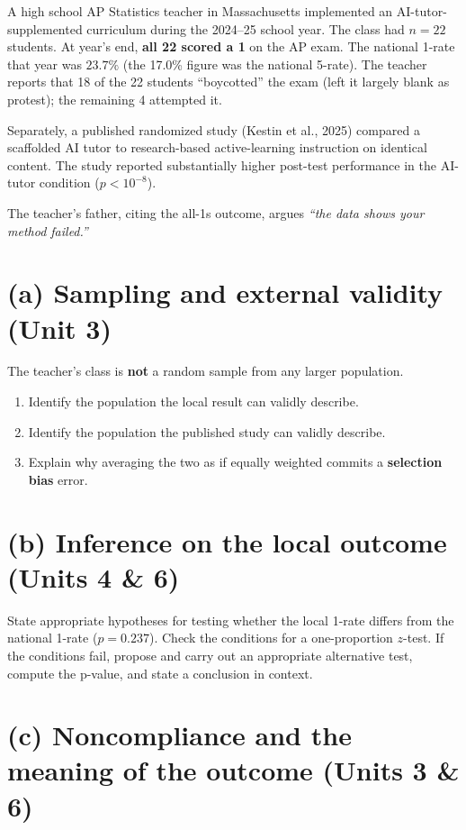 \documentclass[11pt]{article}
\begin{document}
\begin{scenario}
A high school AP Statistics teacher in Massachusetts implemented an
AI-tutor-supplemented curriculum during the 2024--25 school year. The
class had $n = 22$ students. At year's end, \textbf{all 22 scored a 1}
on the AP exam. The national 1-rate that year was $\mathbf{23.7\%}$
(the 17.0\% figure was the national 5-rate). The
teacher reports that 18 of the 22 students ``boycotted'' the exam
(left it largely blank as protest); the remaining 4 attempted it.

Separately, a published randomized study (Kestin et al., 2025) compared
a scaffolded AI tutor to research-based active-learning instruction on
identical content. The study reported substantially higher post-test
performance in the AI-tutor condition ($p < 10^{-8}$).

The teacher's father, citing the all-1s outcome, argues
\emph{``the data shows your method failed.''}
\end{scenario}

\section{(a) Sampling and external validity \textnormal{\small(Unit 3)}}

The teacher's class is \textbf{not} a random sample from any larger
population.
\begin{enumerate}[leftmargin=*,label=(\roman*)]
  \item Identify the population the local result can validly describe.
  \item Identify the population the published study can validly describe.
  \item Explain why averaging the two as if equally weighted commits a
  \textbf{selection bias} error.
\end{enumerate}

\section{(b) Inference on the local outcome \textnormal{\small(Units 4 \& 6)}}

State appropriate hypotheses for testing whether the local 1-rate
differs from the national 1-rate ($p = 0.237$). Check the conditions
for a one-proportion $z$-test. If the conditions fail, propose and
carry out an appropriate alternative test, compute the p-value, and
state a conclusion in context.

\section{(c) Noncompliance and the meaning of the outcome \textnormal{\small(Units 3 \& 6)}}
\end{document}
